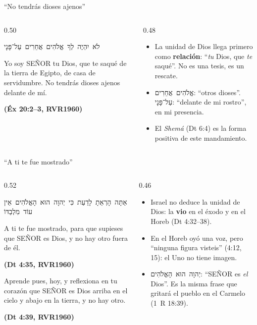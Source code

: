 \documentclass[hyperref={bookmarks=false},aspectratio=169]{beamer}
\newcommand{\heb}[1]{\mbox{\foreignlanguage{hebrew}{#1}}}
\newcommand{\SENOR}{S{\fontsize{0.78em}{1em}\selectfont EÑOR}}
\newcommand{\fuente}[1]{\par\hfill{\upshape\bfseries\footnotesize\textcolor{azul}{#1}}}
\newcommand{\destacar}[1]{\textbf{\textcolor{azul}{#1}}}
\begin{document}
\begin{frame}{``No tendrás dioses ajenos''}
\begin{columns}[t,onlytextwidth]
\begin{column}{0.50\textwidth}
\begin{center}\small\heb{לֹא יִהְיֶה לְךָ אֱלֹהִים אֲחֵרִים עַל־פָּנָי}\end{center}
\begin{cita}Yo soy \SENOR{} tu Dios, que te saqué de la tierra de Egipto, de casa de servidumbre. No tendrás dioses ajenos delante de mí.\fuente{(Éx 20:2--3, RVR1960)}\end{cita}
\end{column}
\begin{column}{0.48\textwidth}\small
\begin{itemize}
\item La unidad de Dios llega primero como \destacar{relación}: ``\emph{tu} Dios, que \emph{te} saqué''. No es una tesis, es un rescate.
\item \heb{אֱלֹהִים אֲחֵרִים}: ``otros dioses''. \heb{עַל־פָּנָי}: ``delante de mi rostro'', en mi presencia.
\item El \emph{Shemá} (Dt 6:4) es la forma positiva de este mandamiento.
\end{itemize}
\end{column}
\end{columns}
\end{frame}

\begin{frame}{``A ti te fue mostrado''}
\begin{columns}[t,onlytextwidth]
\begin{column}{0.52\textwidth}
\begin{center}\scriptsize\heb{אַתָּה הָרְאֵתָ לָדַעַת כִּי יְהוָה הוּא הָאֱלֹהִים אֵין עוֹד מִלְבַדּוֹ}\end{center}
\begin{cita}[fontupper=\scriptsize\itshape]A ti te fue mostrado, para que supieses que \SENOR{} es Dios, y no hay otro fuera de él.\fuente{(Dt 4:35, RVR1960)}\end{cita}
\begin{cita}[fontupper=\scriptsize\itshape]Aprende pues, hoy, y reflexiona en tu corazón que \SENOR{} es Dios arriba en el cielo y abajo en la tierra, y no hay otro.\fuente{(Dt 4:39, RVR1960)}\end{cita}
\end{column}
\begin{column}{0.46\textwidth}\small
\begin{itemize}
\item Israel no deduce la unidad de Dios: la \destacar{vio} en el éxodo y en el Horeb (Dt 4:32--38).
\item En el Horeb oyó una voz, pero ``ninguna figura visteis'' (4:12, 15): el Uno no tiene imagen.
\item \heb{יְהוָה הוּא הָאֱלֹהִים}: ``\SENOR{} es \emph{el} Dios''. Es la misma frase que gritará el pueblo en el Carmelo (1~R 18:39).
\end{itemize}
\end{column}
\end{columns}
\end{frame}
\end{document}
